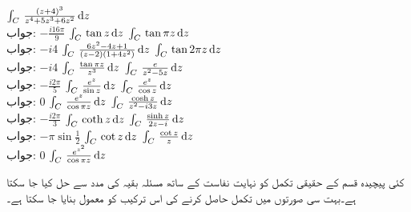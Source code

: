 \quad
$\int_C \,\tfrac{(z+4)^3}{z^4+5z^3+6z^2}\dif z$\\
جواب:\quad
$-\tfrac{i16\pi}{9}$
\quad
$\int_C \,\tan z\dif z$
\quad
$\int_C \,\tan \pi z\dif z$\\
جواب:\quad
$-i4$
\quad
$\int_C \,\tfrac{6z^2-4z+1}{(z-2)(1+4z^2)}\dif z$
\quad
$\int_C \,\tan 2\pi z\dif z$\\
جواب:\quad
$-i4$
\quad
$\int_C \,\tfrac{\tan \pi z}{z^3}\dif z$
\quad
$\int_C \,\tfrac{e}{z^2-5z}\dif z$\\
جواب:\quad
$-\tfrac{i2\pi}{5}$
\quad
$\int_C \,\tfrac{e^z}{\sin z}\dif z$
\quad
$\int_C \,\tfrac{e^z}{\cos z}\dif z$\\
جواب:\quad
$0$
\quad
$\int_C \,\tfrac{e^z}{\cos \pi z}\dif z$
\quad
$\int_C \,\tfrac{\cosh z}{z^2-i3z}\dif z$\\
جواب:\quad
$-\tfrac{i2\pi}{3}$
\quad
$\int_C \,\coth z\dif z$
\quad
$\int_C \,\tfrac{\sinh z}{2z-i}\dif z$\\
جواب:\quad
$-\pi\sin \tfrac{1}{2}$
\quad
$\int_C \,\cot z\dif z$
\quad
$\int_C \,\tfrac{\cot z}{z}\dif z$\\
جواب:\quad
$0$
\quad
$\int_C \,\tfrac{e^{z^2}}{\cos \pi z}\dif z$

کئی پیچیدہ قسم کے حقیقی تکمل کو نہایت نفاست کے ساتھ مسئلہ بقیہ کی  مدد سے حل کیا جا سکتا ہے۔بہت سی صورتوں میں  تکمل حاصل کرنے کی اس ترکیب کو معمول بنایا جا سکتا ہے۔

